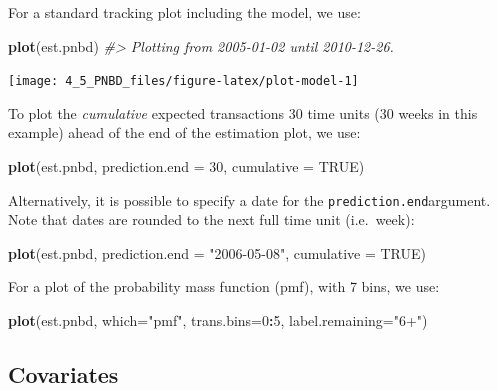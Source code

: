 \documentclass[
]{article}
\newenvironment{Shaded}{\begin{snugshade}}{\end{snugshade}}
\newcommand{\AttributeTok}[1]{\textcolor[rgb]{0.13,0.29,0.53}{#1}}
\newcommand{\CommentTok}[1]{\textcolor[rgb]{0.56,0.35,0.01}{\textit{#1}}}
\newcommand{\ConstantTok}[1]{\textcolor[rgb]{0.56,0.35,0.01}{#1}}
\newcommand{\DecValTok}[1]{\textcolor[rgb]{0.00,0.00,0.81}{#1}}
\newcommand{\FunctionTok}[1]{\textcolor[rgb]{0.13,0.29,0.53}{\textbf{#1}}}
\newcommand{\NormalTok}[1]{#1}
\newcommand{\SpecialCharTok}[1]{\textcolor[rgb]{0.81,0.36,0.00}{\textbf{#1}}}
\newcommand{\StringTok}[1]{\textcolor[rgb]{0.31,0.60,0.02}{#1}}
\begin{document}
For a standard tracking plot including the model, we use:

\begin{Shaded}
\begin{Highlighting}[]
\FunctionTok{plot}\NormalTok{(est.pnbd)}
\CommentTok{\#\textgreater{} Plotting from 2005{-}01{-}02 until 2010{-}12{-}26.}
\end{Highlighting}
\end{Shaded}

\texttt{[image: 4\_5\_PNBD\_files/figure-latex/plot-model-1]}

To plot the \emph{cumulative} expected transactions 30 time units (30
weeks in this example) ahead of the end of the estimation plot, we use:

\begin{Shaded}
\begin{Highlighting}[]
\FunctionTok{plot}\NormalTok{(est.pnbd, }\AttributeTok{prediction.end =} \DecValTok{30}\NormalTok{, }\AttributeTok{cumulative =} \ConstantTok{TRUE}\NormalTok{)}
\end{Highlighting}
\end{Shaded}

Alternatively, it is possible to specify a date for the
\texttt{prediction.end}argument. Note that dates are rounded to the next
full time unit (i.e.~week):

\begin{Shaded}
\begin{Highlighting}[]
\FunctionTok{plot}\NormalTok{(est.pnbd, }\AttributeTok{prediction.end =} \StringTok{"2006{-}05{-}08"}\NormalTok{, }\AttributeTok{cumulative =} \ConstantTok{TRUE}\NormalTok{)}
\end{Highlighting}
\end{Shaded}

For a plot of the probability mass function (pmf), with 7 bins, we use:

\begin{Shaded}
\begin{Highlighting}[]
\FunctionTok{plot}\NormalTok{(est.pnbd, }\AttributeTok{which=}\StringTok{"pmf"}\NormalTok{, }\AttributeTok{trans.bins=}\DecValTok{0}\SpecialCharTok{:}\DecValTok{5}\NormalTok{, }\AttributeTok{label.remaining=}\StringTok{"6+"}\NormalTok{)}
\end{Highlighting}
\end{Shaded}

\subsection{Covariates}\label{covariates}
\end{document}
